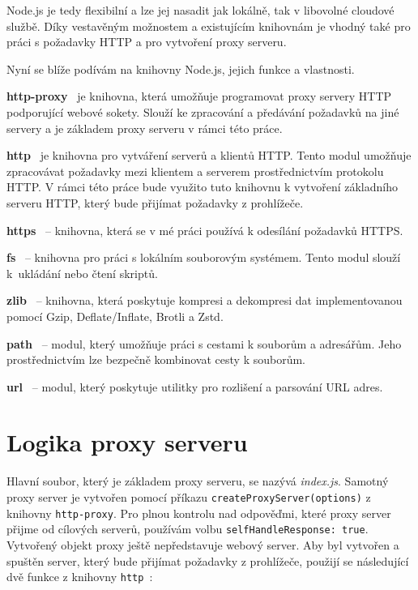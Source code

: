 Node.js je tedy flexibilní a lze jej nasadit jak lokálně, tak v libovolné cloudové službě. Díky vestavěným možnostem a existujícím knihovnám je vhodný také pro práci s požadavky HTTP a pro vytvoření proxy serveru.
\bigskip

Nyní se blíže podívám na knihovny Node.js, jejich funkce a vlastnosti.

\textbf{http-proxy}~\cite{http-proxy} je knihovna, která umožňuje programovat proxy servery HTTP podporující webové sokety. Slouží ke zpracování a předávání požadavků na jiné servery a je základem proxy serveru v rámci této práce.

\textbf{http}~\cite{http} je knihovna pro vytváření serverů a klientů HTTP. Tento modul umožňuje zpracovávat požadavky mezi klientem a serverem prostřednictvím protokolu HTTP. V rámci této práce bude využito tuto knihovnu k vytvoření základního serveru HTTP, který bude přijímat požadavky z prohlížeče.

\textbf{https}~\cite{https} -- knihovna, která se v mé práci používá k odesílání požadavků HTTPS.

\textbf{fs}~\cite{fs} -- knihovna pro práci s lokálním souborovým systémem. Tento modul slouží k~ukládání nebo čtení skriptů.

\textbf{zlib}~\cite{zlib} -- knihovna, která poskytuje kompresi a dekompresi dat implementovanou pomocí Gzip, Deflate/Inflate, Brotli a Zstd.

\textbf{path}~\cite{path} -- modul, který umožňuje práci s cestami k souborům a adresářům. Jeho prostřednictvím lze bezpečně kombinovat cesty k souborům.

\textbf{url}~\cite{url} -- modul, který poskytuje utilitky pro rozlišení a parsování URL adres.

\section{Logika proxy serveru}

Hlavní soubor, který je základem proxy serveru, se nazývá \emph{index.js}. Samotný proxy server je vytvořen pomocí příkazu \texttt{createProxyServer(options)} z knihovny \texttt{http-proxy}. Pro plnou kontrolu nad odpověďmi, které proxy server přijme od cílových serverů, používám volbu \texttt{selfHandleResponse: true}.
Vytvořený objekt proxy ještě nepředstavuje webový server. Aby byl vytvořen a spuštěn server, který bude přijímat požadavky z prohlížeče, použijí se následující dvě funkce z knihovny \texttt{http}~\cite{http-proxy}:

